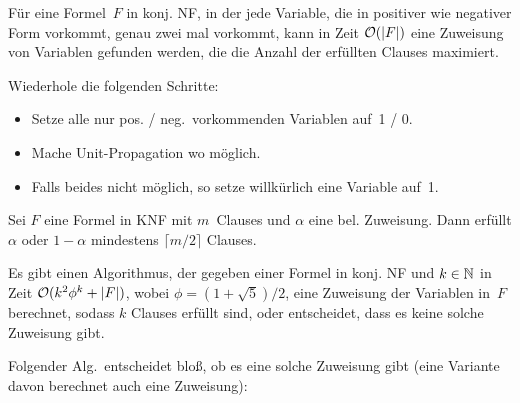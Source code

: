 \documentclass{cheat-sheet}
\newcommand{\size}[1]{\abs{#1}} %
\renewcommand{\O}{\mathcal{O}} %
\newcommand{\ceil}[1]{\lceil #1 \rceil} %
\begin{document}

\begin{lem}
  Für eine Formel~$F$ in konj. NF, in der jede Variable, die in positiver wie negativer Form vorkommt, genau zwei mal vorkommt, kann in Zeit $\O(\size{F})$ eine Zuweisung von Variablen gefunden werden, die die Anzahl der erfüllten Clauses maximiert.
\end{lem}

\begin{alg}
  Wiederhole die folgenden Schritte:
  \begin{itemize}
    \item Setze alle nur pos. / neg.\ vorkommenden Variablen auf~1 / 0.
    \item Mache Unit-Propagation wo möglich.
    \item Falls beides nicht möglich, so setze willkürlich eine Variable auf~1.
  \end{itemize}
\end{alg}

\begin{beob}
  Sei $F$ eine Formel in KNF mit $m$~Clauses und $\alpha$ eine bel. Zuweisung.
  Dann erfüllt $\alpha$ oder $1 - \alpha$ mindestens $\ceil{m/2}$ Clauses.
\end{beob}

\begin{satz}
  Es gibt einen Algorithmus, der gegeben einer Formel in konj. NF und $k \in \mathbb{N}$ in Zeit $\O(k^2 \phi^k + \size{F})$, wobei $\phi = (1 + \sqrt{5}) / 2$, eine Zuweisung der Variablen in~$F$ berechnet, sodass $k$ Clauses erfüllt sind, oder entscheidet, dass es keine solche Zuweisung gibt.
\end{satz}

Folgender Alg.\ entscheidet bloß, ob es eine solche Zuweisung gibt (eine Variante davon berechnet auch eine Zuweisung):
\end{document}
